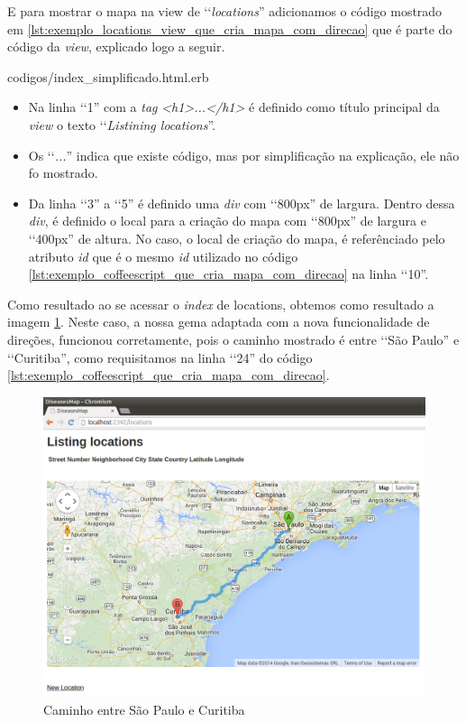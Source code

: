 E para mostrar o mapa na view de ‘‘\emph{locations}'' adicionamos o código mostrado em
\ref{lst:exemplo_locations_view_que_cria_mapa_com_direcao}
que é parte do código da \emph{view}, explicado logo a seguir.


{codigos/index_simplificado.html.erb}

\begin{itemize}

 \item Na linha ‘‘1'' com a \emph{tag} \emph{<h1>...</h1>} é definido como título principal da \emph{view} o
 texto ‘‘\emph{Listining locations}''.
 
 \item Os ‘‘\emph{...}'' indica que existe código, mas por simplificação na explicação, ele não fo mostrado.
 
 \item Da linha ‘‘3'' a ‘‘5'' é definido uma \emph{div} com ‘‘800px'' de largura. Dentro dessa \emph{div},
 é definido o local para a criação do mapa com ‘‘800px'' de largura e ‘‘400px'' de altura. No caso, o local 
 de criação do mapa, é referênciado pelo atributo \emph{id} que é o mesmo \emph{id} utilizado no código 
 \ref{lst:exemplo_coffeescript_que_cria_mapa_com_direcao} na linha ‘‘10''.  
 
\end{itemize}

Como resultado ao se acessar o \emph{index} de locations, obtemos como resultado a imagem
\ref{fig:caminho_entre_sao_paulo_e_curitiba}. Neste caso, a nossa gema adaptada com a nova funcionalidade
de direções, funcionou corretamente, pois o caminho mostrado é entre ‘‘São Paulo'' e ‘‘Curitiba'', como
requisitamos na linha ‘‘24'' do código \ref{lst:exemplo_coffeescript_que_cria_mapa_com_direcao}.

\begin{figure}[ht]
  \begin{center}       
    \includegraphics[scale=0.35]{images/caminho_entre_sao_paulo_e_curitiba.png}
    \caption{Caminho entre São Paulo e Curitiba}
    \label{fig:caminho_entre_sao_paulo_e_curitiba}
  \end{center}    
\end{figure}
